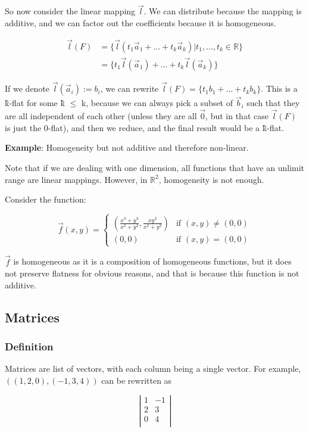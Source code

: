 \documentclass[11 pt, twoside]{article}
\begin{document}
So now consider the linear mapping $\vec{l}$. We can distribute because the
mapping is additive, and we can factor out the coefficients because it is
homogeneous.

\begin{align*}
\vec{l}(F) &= \{\vec{l}(t_1\vec{a}_1 + \dots + t_k\vec{a}_k) | t_1, \dots, t_k \in \mathbb{R}\}\\
&= \{t_1 \vec{l}(\vec{a}_1) + \dots + t_k \vec{l}(\vec{a}_k)\}
\end{align*}

If we denote $\vec{l}(\vec{a}_i) := b_i$, we can rewrite $\vec{l}(F) = \{t_1
b_1 + \dots + t_k b_k\}$. This is a \~{k}-flat for some \~{k} $\leq$ k, because
we can always pick a subset of $\vec{b}_i$ such that they are all independent of
each other (unless they are all $\vec{0}$, but in that case $\vec{l}(F)$ is just
the 0-flat), and then we reduce, and the final result would be a \~{k}-flat.
\vspace{0.2cm}

\textbf{Example}: Homogeneity but not additive and therefore non-linear.

Note that if we are dealing with one dimension, all functions that have an
unlimit range are linear mappings. However, in $\mathbb{R}^2$, homogeneity is
not enough.

Consider the function:

\[
\vec{f}(x, y) =
\begin{cases}
(\frac{x^3 + y^3}{x^2 + y^2}, \frac{xy^2}{x^2+y^2}) & \mbox{if } (x,
y) \neq (0, 0)\\
(0, 0) & \mbox{if } (x, y) = (0,0)
\end{cases}
\]

$\vec{f}$ is homogeneous as it is a composition of homogeneous functions, but it
does not preserve flatness for obvious reasons, and that is because this
function is not additive.

\subsection{Matrices}
\subsubsection{Definition}
Matrices are list of vectors, with each column being a single vector. For
example, $((1,2,0),(-1, 3, 4))$ can be rewritten as

$$\left|\begin{array}{cc}
1 & -1\\
2 & 3\\
0 & 4\\
\end{array} \right|$$
\end{document}
